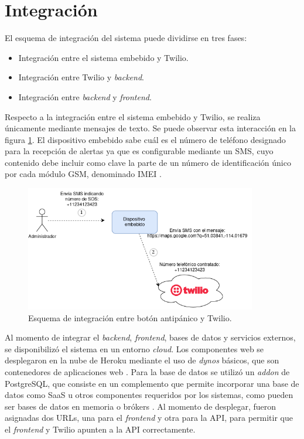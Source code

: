 \pagebreak


\section{Integración}

El esquema de integración del sistema puede dividirse en tres fases:
\begin{itemize}
	\item Integración entre el sistema embebido y Twilio.
	\item Integración entre Twilio y \textit{backend}.
	\item Integración entre \textit{backend} y \textit{frontend}.
\end{itemize}

Respecto a la integración entre el sistema embebido y Twilio, se realiza únicamente mediante mensajes de texto. Se puede observar esta interacción en la figura \ref{integracion:1}. El dispositivo embebido sabe cuál es el número de teléfono designado para la recepción de alertas ya que es configurable mediante un SMS, cuyo contenido debe incluir como clave la parte de un número de identificación único por cada módulo GSM, denominado IMEI \citep{IMEI:1}.

\begin{figure}[H]
	\centering
	\includegraphics[width=0.9\textwidth]{./Figures/integracion-1.png}
	\caption{Esquema de integración entre botón antipánico y Twilio.}
	\label{integracion:1}
\end{figure}

Al momento de integrar el \textit{backend}, \textit{frontend}, bases de datos y servicios externos, se disponibilizó el sistema en un entorno \textit{cloud}. Los componentes web se desplegaron en la nube de Heroku mediante el uso de \textit{dynos} básicos, que son contenedores de aplicaciones web \citep{HEROKU:1}. Para la base de datos se utilizó un \textit{addon} de PostgreSQL, que consiste en un complemento que permite incorporar una base de datos como SaaS u otros componentes requeridos por los sistemas, como pueden ser bases de datos en memoria o brókers \citep{HEROKU:2}. Al momento de desplegar, fueron asignadas dos URLs, una para el \textit{frontend} y otra para la API, para permitir que el \textit{frontend} y Twilio apunten a la API correctamente.

